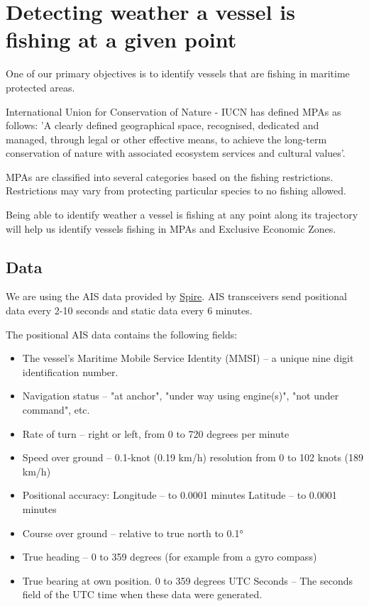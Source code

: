 \section{Detecting weather a vessel is fishing at a given point}
One of our primary objectives is to identify vessels that are fishing in maritime protected areas.

International Union for Conservation of Nature - IUCN has defined MPAs as follows:
'A clearly defined geographical space, recognised, dedicated and managed, through legal or other effective means, to achieve the long-term conservation of nature with associated ecosystem services and cultural values'.

MPAs are classified into several categories based on the fishing restrictions. Restrictions may vary from protecting particular species to no fishing allowed.

Being able to identify weather a vessel is fishing at any point along its trajectory will help us identify vessels fishing in MPAs and Exclusive Economic Zones.

\subsection{Data}

We are using the AIS data provided by \href{https://spire.com/}{Spire}.
AIS transceivers send positional data every 2-10 seconds and static data every 6 minutes.

The positional AIS data contains the following fields:
\begin{itemize}
\item The vessel's Maritime Mobile Service Identity (MMSI) – a unique nine digit identification number.
\item Navigation status – "at anchor", "under way using engine(s)", "not under command", etc.
\item Rate of turn – right or left, from 0 to 720 degrees per minute
\item Speed over ground – 0.1-knot (0.19 km/h) resolution from 0 to 102 knots (189 km/h)
\item Positional accuracy:
Longitude – to 0.0001 minutes
Latitude – to 0.0001 minutes
\item Course over ground – relative to true north to 0.1°
\item True heading – 0 to 359 degrees (for example from a gyro compass)
\item True bearing at own position. 0 to 359 degrees
UTC Seconds – The seconds field of the UTC time when these data were generated.
\end{itemize}

